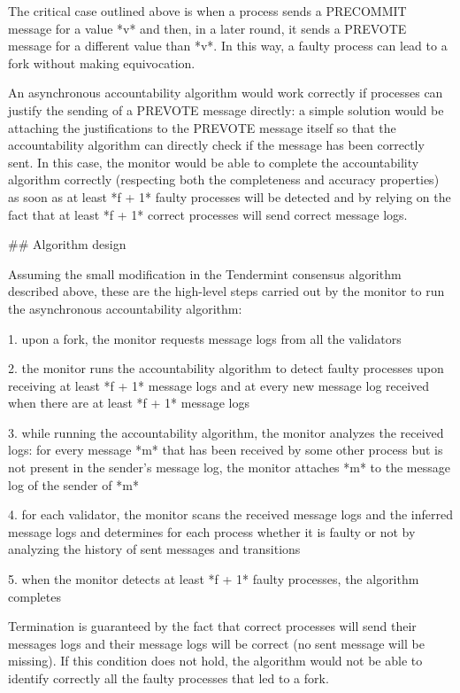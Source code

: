 \documentclass[a4paper,11pt,oneside]{report}
\begin{document}
\begin{markdown}
The critical case outlined above is when a process sends a PRECOMMIT message for a value *v* and then, in a later round, it sends a PREVOTE message for a different value than *v*. In this way, a faulty process can lead to a fork without making equivocation.

An asynchronous accountability algorithm would work correctly if processes can justify the sending of a PREVOTE message directly: a simple solution would be attaching the justifications to the PREVOTE message itself so that the accountability algorithm can directly check if the message has been correctly sent.
In this case, the monitor would be able to complete the accountability algorithm correctly (respecting both the completeness and accuracy properties) as soon as at least *f + 1* faulty processes will be detected and by relying on the fact that at least *f + 1* correct processes will send correct message logs.

## Algorithm design
 
Assuming the small modification in the Tendermint consensus algorithm described above, these are the high-level steps carried out by the monitor to run the asynchronous accountability algorithm:

1. upon a fork, the monitor requests message logs from all the validators

2. the monitor runs the accountability algorithm to detect faulty processes upon receiving at least *f + 1* message logs and at every new message log received when there are at least *f + 1* message logs 

3. while running the accountability algorithm, the monitor analyzes the received logs: for every message *m* that has been received by some other process but is not present in the sender's message log, the monitor attaches *m* to the message log of the sender of *m*

4. for each validator, the monitor scans the received message logs and the inferred message logs and determines for each process whether it is faulty or not by analyzing the history of sent messages and transitions

5. when the monitor detects at least *f + 1* faulty processes, the algorithm completes

Termination is guaranteed by the fact that correct processes will send their messages logs and their message logs will be correct (no sent message will be missing). 
If this condition does not hold, the algorithm would not be able to identify correctly all the faulty processes that led to a fork. 


\end{markdown}
\end{document}
